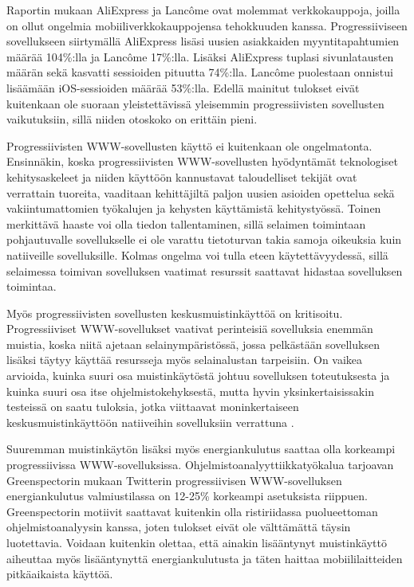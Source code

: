 \documentclass[utf8]{gradu3}
\begin{document}
Raportin mukaan AliExpress ja Lancôme ovat molemmat verkkokauppoja, joilla on ollut ongelmia mobiiliverkkokauppojensa tehokkuuden kanssa. Progressiiviseen sovellukseen siirtymällä AliExpress lisäsi uusien asiakkaiden myyntitapahtumien määrää 104\%:lla ja Lancôme 17\%:lla. Lisäksi AliExpress tuplasi sivunlatausten määrän sekä kasvatti sessioiden pituutta 74\%:lla. Lancôme puolestaan onnistui lisäämään iOS-sessioiden määrää 53\%:lla. Edellä mainitut tulokset eivät kuitenkaan ole suoraan yleistettävissä yleisemmin progressiivisten sovellusten vaikutuksiin, sillä niiden otoskoko on erittäin pieni. \parencite[]{beginners-guide-pwa}

Progressiivisten WWW-sovellusten käyttö ei kuitenkaan ole ongelmatonta. Ensinnäkin, koska progressiivisten WWW-sovellusten hyödyntämät teknologiset kehitysaskeleet ja niiden käyttöön kannustavat taloudelliset tekijät ovat verrattain tuoreita, vaaditaan kehittäjiltä paljon uusien asioiden opettelua sekä vakiintumattomien työkalujen ja kehysten käyttämistä kehitystyössä. Toinen merkittävä haaste voi olla tiedon tallentaminen, sillä selaimen toimintaan pohjautuvalle sovellukselle ei ole varattu tietoturvan takia samoja oikeuksia kuin natiiveille sovelluksille. Kolmas ongelma voi tulla eteen käytettävyydessä, sillä selaimessa toimivan sovelluksen vaatimat resurssit saattavat hidastaa sovelluksen toimintaa. \parencite[]{pwa-design-challenges}

Myös progressiivisten sovellusten keskusmuistinkäyttöä on kritisoitu. Progressiiviset WWW-sovellukset vaativat perinteisiä sovelluksia enemmän muistia, koska niitä ajetaan selainympäristössä, jossa pelkästään sovelluksen lisäksi täytyy käyttää resursseja myös selainalustan tarpeisiin. On vaikea arvioida, kuinka suuri osa muistinkäytöstä johtuu sovelluksen toteutuksesta ja kuinka suuri osa itse ohjelmistokehyksestä, mutta hyvin yksinkertaisissakin testeissä on saatu tuloksia, jotka viittaavat moninkertaiseen keskusmuistinkäyttöön natiiveihin sovelluksiin verrattuna \parencite[]{electron-memory-usage}.

Suuremman muistinkäytön lisäksi myös energiankulutus saattaa olla korkeampi progressiivissa WWW-sovelluksissa. Ohjelmistoanalyyttiikkatyökalua tarjoavan Greenspectorin mukaan \parencite[]{pwa-power-usage} Twitterin progressiivisen WWW-sovelluksen energiankulutus valmiustilassa on 12-25\% korkeampi asetuksista riippuen. Greenspectorin motiivit saattavat kuitenkin olla ristiriidassa puolueettoman ohjelmistoanalyysin kanssa, joten tulokset eivät ole välttämättä täysin luotettavia. Voidaan kuitenkin olettaa, että ainakin lisääntynyt muistinkäyttö aiheuttaa myös lisääntynyttä energiankulutusta ja täten haittaa mobiililaitteiden pitkäaikaista käyttöä.
\end{document}
